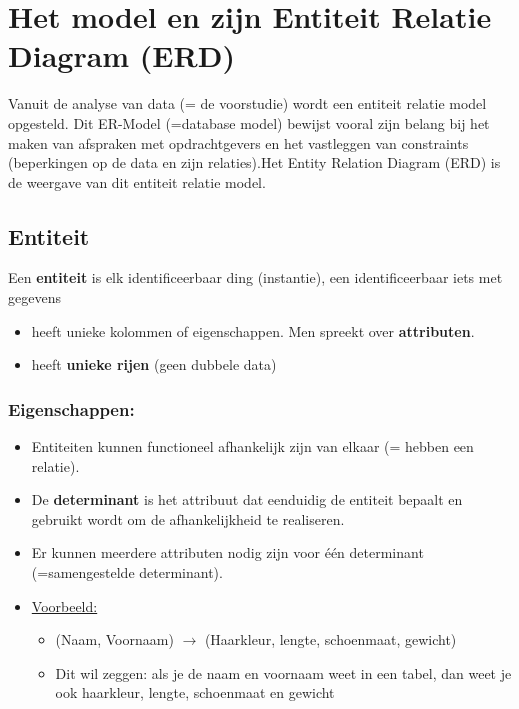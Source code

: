 \documentclass{article}
\newcommand{\bold}[1]{\textbf{#1}}
\begin{document}
\section{Het model en zijn Entiteit Relatie Diagram (ERD)}

Vanuit de analyse van data (= de voorstudie) wordt een entiteit relatie model opgesteld. 
Dit ER-Model (=database model) bewijst vooral zijn belang bij het maken van afspraken met opdrachtgevers
en het vastleggen van constraints (beperkingen op de data en zijn relaties).Het Entity Relation Diagram (ERD) is de weergave van dit entiteit relatie model. 

\subsection{Entiteit}
Een \bold{entiteit} is elk identificeerbaar ding (instantie), een identificeerbaar iets met gegevens
\begin{itemize}
    \item heeft unieke kolommen of eigenschappen. Men spreekt over \bold{attributen}.
    \item heeft \bold{unieke rijen} (geen dubbele data)
\end{itemize}

\subsubsection{Eigenschappen:}
\begin{itemize}
    \item Entiteiten kunnen functioneel afhankelijk zijn van elkaar (= hebben een relatie).
    \item De \bold{determinant} is het attribuut dat eenduidig de entiteit bepaalt en gebruikt wordt om de afhankelijkheid te realiseren. 
    \item Er kunnen meerdere attributen nodig zijn voor één determinant (=samengestelde determinant).
    \item \underline{Voorbeeld: }
    \begin{itemize}
        \item (Naam, Voornaam) $\rightarrow$ (Haarkleur, lengte, schoenmaat, gewicht)
        \item Dit wil zeggen: als je de naam en voornaam weet in een tabel, dan weet je ook haarkleur, lengte, schoenmaat en gewicht
    \end{itemize}
\end{itemize}
\end{document}
